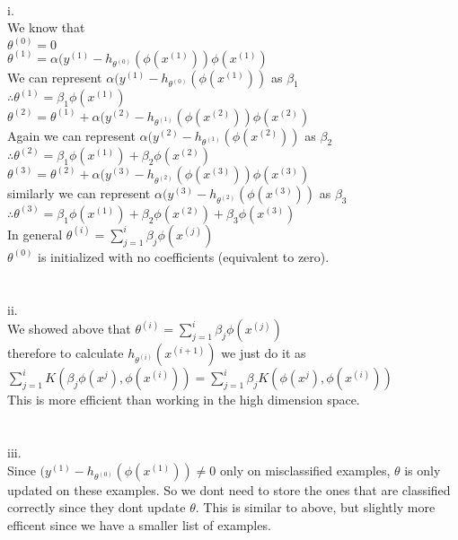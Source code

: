 \begin{answer}\\
i.\\
We know that\\
$\theta^{(0)}=0$\\
$\theta^{(1)}=\alpha(y^{(1)}-h_{\theta^{(0)}}(\phi(x^{(1)}))\phi(x^{(1)})$\\
We can represent $\alpha(y^{(1)}-h_{\theta^{(0)}}(\phi(x^{(1)}))$ as $\beta_1$\\
$\therefore \theta^{(1)}=\beta_1 \phi(x^{(1)})$\\
$\theta^{(2)}=\theta^{(1)}+\alpha(y^{(2)}-h_{\theta^{(1)}}(\phi(x^{(2)}))\phi(x^{(2)})$\\
Again we can represent $\alpha(y^{(2)}-h_{\theta^{(1)}}(\phi(x^{(2)}))$ as $\beta_2$\\
$\therefore \theta^{(2)}=\beta_1 \phi(x^{(1)})+\beta_2 \phi(x^{(2)})$\\
$\theta^{(3)}=\theta^{(2)}+\alpha(y^{(3)}-h_{\theta^{(2)}}(\phi(x^{(3)}))\phi(x^{(3)})$\\
similarly we can represent $\alpha(y^{(3)}-h_{\theta^{(2)}}(\phi(x^{(3)}))$ as $\beta_3$\\
$\therefore \theta^{(3)}=\beta_1 \phi(x^{(1)})+\beta_2 \phi(x^{(2)})+\beta_3 \phi(x^{(3)})$\\
In general $\theta^{(i)}=\sum_{j=1}^{i}\beta_j \phi(x^{(j)})$\\
$\theta^{(0)}$ is initialized with no coefficients (equivalent to zero).\\
\\
\\
ii.\\
We showed above that $\theta^{(i)}=\sum_{j=1}^{i}\beta_j \phi(x^{(j)})$\\
therefore to calculate $h_{\theta^{(i)}}(x^{(i+1)})$ we just do it as $\sum_{j=1}^{i} K(\beta_j\phi(x^{j}),\phi(x^{(i)}))=\sum_{j=1}^{i}\beta_j K(\phi(x^{j}),\phi(x^{(i)}))$\\
This is more efficient than working in the high dimension space.\\
\\
\\
iii. \\
Since $(y^{(1)}-h_{\theta^{(0)}}(\phi(x^{(1)})) \neq 0$ only on misclassified examples, $\theta$ is only updated on these examples. So we dont need to store the ones that are classified correctly since they dont update $\theta$. This is similar to above, but slightly more efficent since we have a smaller list of examples.
\end{answer}
